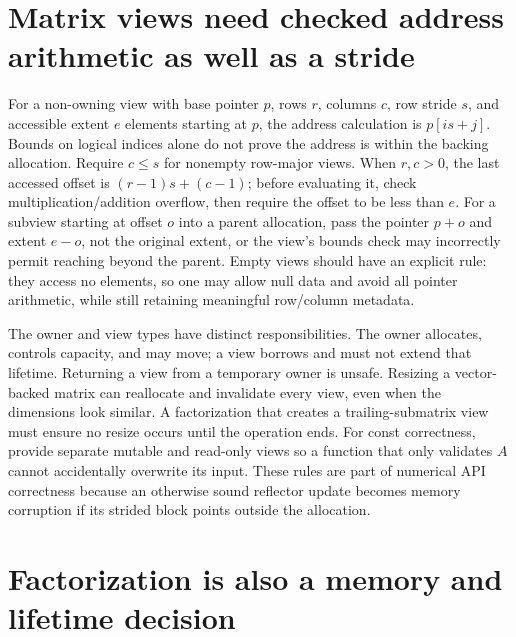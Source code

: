 \section{Matrix views need checked address arithmetic as well as a stride}\label{02-foundations-ii-ch038-matrix-views-need-checked-address-arithmetic-as-well-as-a-stride}

\hypertarget{02-foundations-ii-ch038-matrix-views-need-checked-address-arithmetic-as-well-as-a-stride}{}

For a non-owning view with base pointer \(p\), rows \(r\), columns \(c\), row stride \(s\), and accessible extent \(e\) elements starting at \(p\), the address calculation is \(p[i s+j]\). Bounds on logical indices alone do not prove the address is within the backing allocation. Require \(c\le s\) for nonempty row-major views. When \(r,c>0\), the last accessed offset is \((r-1)s+(c-1)\); before evaluating it, check multiplication/addition overflow, then require the offset to be less than \(e\). For a subview starting at offset \(o\) into a parent allocation, pass the pointer \(p+o\) and extent \(e-o\), not the original extent, or the view's bounds check may incorrectly permit reaching beyond the parent. Empty views should have an explicit rule: they access no elements, so one may allow null data and avoid all pointer arithmetic, while still retaining meaningful row/column metadata.

The owner and view types have distinct responsibilities. The owner allocates, controls capacity, and may move; a view borrows and must not extend that lifetime. Returning a view from a temporary owner is unsafe. Resizing a vector-backed matrix can reallocate and invalidate every view, even when the dimensions look similar. A factorization that creates a trailing-submatrix view must ensure no resize occurs until the operation ends. For const correctness, provide separate mutable and read-only views so a function that only validates \(A\) cannot accidentally overwrite its input. These rules are part of numerical API correctness because an otherwise sound reflector update becomes memory corruption if its strided block points outside the allocation.

\section{Factorization is also a memory and lifetime decision}\label{02-foundations-ii-ch038-factorization-is-also-a-memory-and-lifetime-decision}

\hypertarget{02-foundations-ii-ch038-factorization-is-also-a-memory-and-lifetime-decision}{}


